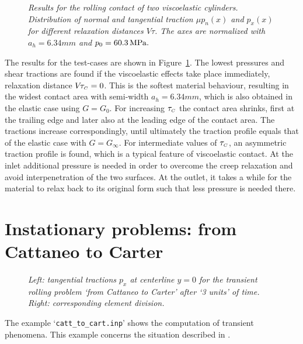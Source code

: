 \documentclass[12pt]{report}
\begin{document}
\begin{figure}[bt]
\centering
{}
\caption{\em Results for the rolling contact of two viscoelastic cylinders.
Distribution of normal and tangential traction $\mu p_n(x)$ and
$p_x(x)$ for different relaxation distances $V\!\tau$. The axes are
normalized with $a_h=6.34\unit{mm}$ and $p_0= 60.3\,\mathrm{MPa}.$}
\label{fig:visc_cylindr}
\end{figure}

The results for the test-cases are shown in Figure~\ref{fig:visc_cylindr}. The
lowest pressures and shear tractions are found if the viscoelastic effects
take place immediately, relaxation distance $V\!\tau_{\scriptscriptstyle C}=0$. This is the
softest material behaviour, resulting in the widest contact area with
semi-width $a_h=6.34\unit{mm}$, which is also obtained in the elastic case
using $G=G_0$. For increasing $\tau_{\scriptscriptstyle C}$ the contact area
shrinks, first at the trailing edge and later also at the leading edge of
the contact area. The tractions increase correspondingly, until ultimately
the traction profile equals that of the elastic case with $G=G_{\infty}$.
For intermediate values of $\tau_{\scriptscriptstyle C}$, an asymmetric traction profile is
found, which is a typical feature of viscoelastic contact. At the inlet
additional pressure is needed in order to overcome the creep relaxation and
avoid interpenetration of the two surfaces. At the outlet, it takes a while
for the material to relax back to its original form such that less pressure
is needed there.

\section{Instationary problems: from Cattaneo to Carter}
\label{sec:ex_catt_to_cart}

\begin{figure}[bt]
\centering
{}
\caption{\em Left: tangential tractions $p_x$ at centerline $y=0$ for the
transient rolling problem `from Cattaneo to Carter' after `3 units' of
time. Right: corresponding element division.}
\label{fig:catt_cart}
\end{figure}

The example `{\tt catt\_to\_cart.inp}' shows the computation of transient
phenomena. This example concerns the situation described in
\cite[paragraph 5.2.2.5]{Kalker1990}.
\end{document}
